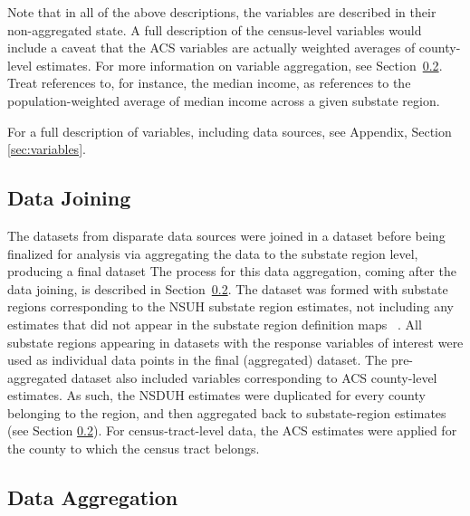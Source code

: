 \documentclass{article}
\begin{document}
Note that in all of the above descriptions, the variables are described in their
non-aggregated state. A full description of the census-level variables would
include a caveat that the ACS variables are actually weighted averages of
county-level estimates. For more information on variable aggregation, see
Section~\ref{sec:aggregation}. Treat references to, for instance, the
median income, as references to the population-weighted average of
median income across a given substate region.

For a full description of variables, including data sources, see
Appendix, Section \ref{sec:variables}.

\subsection{Data Joining}\label{sec:joining}

The datasets from disparate data sources were joined
in a dataset before being finalized for analysis
via aggregating the data to the substate region level,
producing a final dataset
The process for this data aggregation, coming after
the data joining, is described in Section~\ref{sec:aggregation}.
The dataset was formed with substate regions corresponding to
the NSUH substate region estimates,
not including any estimates that did not appear in
the substate region definition maps
\cite{samhsa_data}~\cite{samhsa_substate_region_defs}.
All substate regions appearing in datasets with the response
variables of interest were used as individual data points in the
final (aggregated) dataset.
The pre-aggregated dataset also included variables
corresponding to ACS county-level estimates.
As such, the NSDUH estimates were duplicated
for every county belonging to the region,
and then aggregated back to substate-region estimates (see Section
\ref{sec:aggregation}).
For census-tract-level data, the ACS estimates
were applied for the county to which the census tract belongs.

\subsection{Data Aggregation}\label{sec:aggregation}
\end{document}
